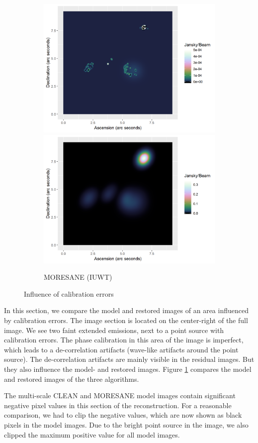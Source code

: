 \begin{figure}[!ht]
\begin{subfigure}[b]{1.0\linewidth}
	\end{subfigure}
	\begin{subfigure}[b]{1.0\linewidth}
		\centering
		\includegraphics[width=0.45\linewidth]{./chapters/10.results/iuwt/iuwt-Calibration.png}
		\includegraphics[width=0.45\linewidth]{./chapters/10.results/iuwt/iuwt-image-Calibration.png}
		\caption{MORESANE (IUWT)}
	\end{subfigure}
	\caption{Influence of calibration errors}
	\label{results:cleancomp::calib:figure}
\end{figure}

In this section, we compare the model and restored images of an area influenced by calibration errors. The image section is located on the center-right of the full image. We see two faint extended emissions, next to a point source with calibration errors. The phase calibration in this area of the image is imperfect, which leads to a de-correlation artifacts (wave-like artifacts around the point source). The de-correlation artifacts are mainly visible in the residual images. But they also influence the model- and restored images. Figure \ref{results:cleancomp::calib:figure} compares the model and restored images of the three algorithms.

The multi-scale CLEAN and MORESANE model images contain significant negative pixel values in this section of the reconstruction. For a reasonable comparison, we had to clip the negative values, which are now shown as black pixels in the model images. Due to the bright point source in the image, we also clipped the maximum positive value for all model images.

